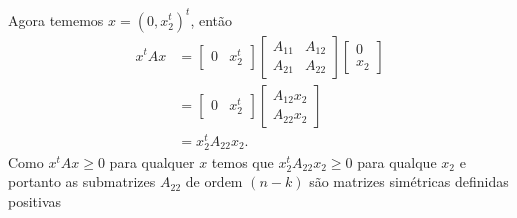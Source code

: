 \documentclass[a4paper,12pt, leqno, answers]{exam}
\begin{document}
\begin{questions}
\begin{solution}
        Agora tememos $x = (0, x_2^t)^t$, ent\~{a}o
        \begin{align*}
            x^t A x &= \begin{bmatrix}
                0 & x_2^t
            \end{bmatrix} \begin{bmatrix}
                A_{11} & A_{12} \\
                A_{21} & A_{22}
            \end{bmatrix} \begin{bmatrix}
                0 \\
                x_2
            \end{bmatrix} \\
            &= \begin{bmatrix}
                0 & x_2^t
            \end{bmatrix} \begin{bmatrix}
                A_{12} x_2 \\
                A_{22} x_2
            \end{bmatrix} \\
            &= x_2^t A_{22} x_2.
        \end{align*}
        Como $x^t A x \geq 0$ para qualquer $x$ temos que $x_2^t A_{22} x_2 \geq 0$ para qualque $x_2$ e portanto as submatrizes $A_{22}$ de ordem $(n - k)$ s\~{a}o matrizes sim\'{e}tricas definidas positivas
    \end{solution}
\end{questions}


\end{document}

